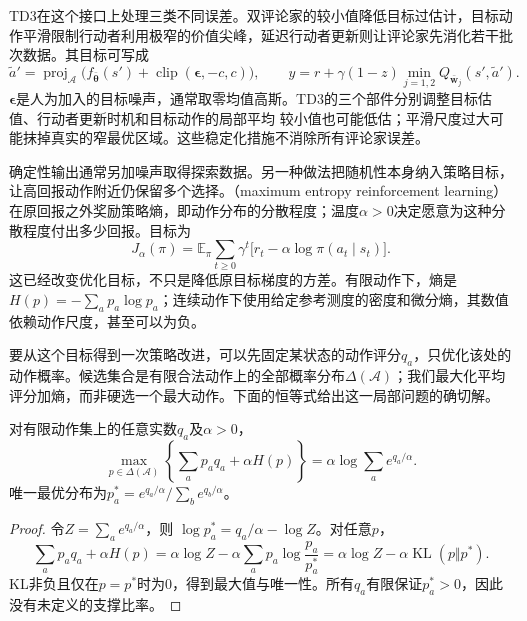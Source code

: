 TD3在这个接口上处理三类不同误差。双评论家的较小值降低目标过估计，目标动作平滑限制行动者利用极窄的价值尖峰，延迟行动者更新则让评论家先消化若干批次数据。其目标可写成
\[
  \widetilde a'
    =\operatorname{proj}_{\mathcal A}
        \bigl(f_{\bar{\bm\theta}}(s')
              +\operatorname{clip}(\bm\epsilon,-c,c)\bigr),
  \qquad
  y=r+\gamma(1-z)\min_{j=1,2}Q_{\bar{\bm w}_j}(s',\widetilde a').
\]
$\bm\epsilon$是人为加入的目标噪声，通常取零均值高斯。TD3的三个部件分别调整目标估值、行动者更新时机和目标动作的局部平均
较小值也可能低估；平滑尺度过大可能抹掉真实的窄最优区域。这些稳定化措施不消除所有评论家误差。

确定性输出通常另加噪声取得探索数据。另一种做法把随机性本身纳入策略目标，让高回报动作附近仍保留多个选择。（maximum entropy reinforcement learning）在原回报之外奖励策略熵，即动作分布的分散程度；温度$\alpha>0$决定愿意为这种分散程度付出多少回报。目标为
\begin{equation}
  J_\alpha(\pi)=\mathbb E_\pi\sum_{t\geq0}\gamma^t
      \bigl[r_t-\alpha\log\pi(a_t\mid s_t)\bigr].
  \label{eq:rl-learning-maxent-objective}
\end{equation}
这已经改变优化目标，不只是降低原目标梯度的方差。有限动作下，熵是
$H(p)=-\sum_a p_a\log p_a$；连续动作下使用给定参考测度的密度和微分熵，其数值依赖动作尺度，甚至可以为负。

要从这个目标得到一次策略改进，可以先固定某状态的动作评分$q_a$，只优化该处的动作概率。候选集合是有限合法动作上的全部概率分布$\Delta(\mathcal A)$；我们最大化平均评分加熵，而非硬选一个最大动作。下面的恒等式给出这一局部问题的确切解。

\begin{theorem}[熵正则的变分恒等式]
  \label{thm:rl-learning-entropy-variational}
  对有限动作集上的任意实数$q_a$及$\alpha>0$，
  \[
    \max_{p\in\Delta(\mathcal A)}
       \left\{\sum_a p_a q_a+\alpha H(p)\right\}
      =\alpha\log\sum_a e^{q_a/\alpha}.
  \]
  唯一最优分布为$p_a^*=e^{q_a/\alpha}/\sum_b e^{q_b/\alpha}$。
\end{theorem}
\begin{proof}
  令$Z=\sum_a e^{q_a/\alpha}$，则
  $\log p_a^*=q_a/\alpha-\log Z$。对任意$p$，
  \[
    \sum_a p_aq_a+\alpha H(p)
      =\alpha\log Z
          -\alpha\sum_a p_a\log\frac{p_a}{p_a^*}
      =\alpha\log Z-\alpha\operatorname{KL}(p\Vert p^*).
  \]
  KL非负且仅在$p=p^*$时为0，得到最大值与唯一性。所有$q_a$有限保证$p_a^*>0$，因此没有未定义的支撑比率。
\end{proof}

